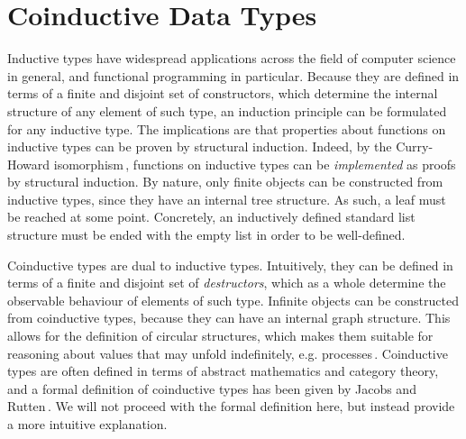 \section{Coinductive Data Types}
\label{sec:coinductive-types}
\newcommand{\bisim}{\text{\texttildelow}}

Inductive types have widespread applications across the field of computer
science in general, and functional programming in particular. Because they are
defined in terms of a finite and disjoint set of constructors, which determine
the internal structure of any element of such type, an induction
principle can be formulated for any inductive type. The implications are that
properties about functions on inductive types can be proven by structural
induction. Indeed, by the Curry-Howard
isomorphism\,\citep{Curry1934,Howard80,Wadler2014}, functions on inductive types
can be \emph{implemented} as proofs by structural induction. By nature, only
finite objects can be constructed from inductive types, since they have an
internal tree structure. As such, a leaf must be reached at some
point. Concretely, an inductively defined standard list structure must be ended
with the empty list in order to be well-defined.

Coinductive types are dual to inductive types. Intuitively, they can be defined
in terms of a finite and disjoint set of \emph{destructors}, which as a whole
determine the observable behaviour of elements of such type. Infinite objects
can be constructed from coinductive types, because they can have an internal
graph structure. This allows for the definition of circular structures, which
makes them suitable for reasoning about values that may unfold indefinitely,
e.g. processes\,\citep{Sangiorgi2011}. Coinductive types are often defined in
terms of abstract mathematics and category theory, and a formal definition of
coinductive types has been given by Jacobs and
Rutten\,\citep{Jacobs97atutorial}. We will not proceed with the formal
definition here, but instead provide a more intuitive explanation.

